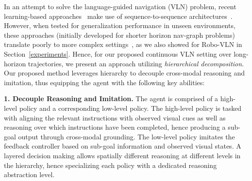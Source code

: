 \documentclass[letter, 10pt, conference]{ieeeconf}
\begin{document}
\begin{comment}
Consider an example instruction as shown in Figure \ref{overview}: \enquote{Move forward through the corridor and turn right into the bedroom. Wait by the window on the right}. 
When following this sequence of instructions, the robot has to learn to identify key objects in the scene (\textit Perception), keep track of which instructions are completed (\textit Memory), match instructions to spatial information in the environment (\textit Cognition/Reasoning) and act on the high-level decisions to generate low-level control commands for navigation in $R^3$ space (\textit Controls).
\end{comment}

In an attempt to solve the language-guided navigation (VLN) problem, recent learning-based approaches~\cite{ma2019theregretful, ma2019selfmonitoring, wang2019reinforced} make use of sequence-to-sequence architectures~\cite{10.5555/2969033.2969173}. However, when tested for generalization performance in unseen environments, these approaches (initially developed for shorter horizon nav-graph problems) translate poorly to more complex settings~\cite{ALFRED20,krantz2020navgraph}, as we also showed for Robo-VLN in Section~\ref{experiments}.
Hence, for our proposed continuous VLN setting over long-horizon trajectories, we present an approach utilizing \textit{hierarchical decomposition}. Our proposed method leverages hierarchy to decouple cross-modal reasoning and imitation, thus equipping the agent with the following key abilities: 

\textbf{1. Decouple Reasoning and Imitation.}
The agent is comprised of a high-level policy and a corresponding low-level policy. The high-level policy is tasked with aligning the relevant instructions with observed visual cues as well as reasoning over which instructions have been completed, hence producing a sub-goal output through cross-modal grounding. 
The low-level policy imitates the feedback controller based on sub-goal information and observed visual states. A layered decision making allows spatially different reasoning at different levels in the hierarchy, hence specializing each policy with a dedicated reasoning abstraction level.
\end{document}
